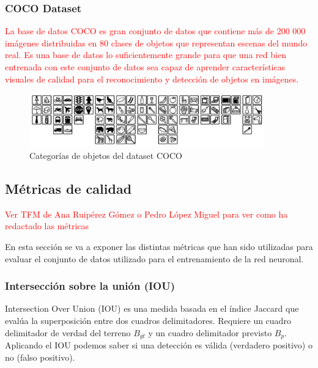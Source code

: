 \subsubsection{COCO Dataset}
\label{subsubsec:coco-dataset}

\textcolor{red}{La base de datos COCO es gran conjunto de datos que contiene más de 200 000 imágenes distribuidas en 80 clases de objetos que representan escenas del mundo real. Es una base de datos lo suficientemente grande para que una red bien entrenada con este conjunto de datos sea capaz de aprender características visuales de calidad para el reconocimiento y detección de objetos en imágenes.}

\begin{figure}[ht]
\centering
\includegraphics[width=0.9\textwidth]{img/chapters/resultados/bases-datos/cocodataset.png}
\caption{\label{fig:cocodataset}Categorías de objetos del dataset COCO}
\end{figure}

\subsection{Métricas de calidad}
\label{subsec:metricas-calidad}

\textcolor{red}{Ver TFM de Ana Ruipérez Gómez o Pedro López Miguel para ver como ha redactado las métricas} 

En esta sección se va a exponer las distintas métricas \cite{padillaCITE2020} que han sido utilizadas para evaluar el conjunto de datos utilizado para el entrenamiento de la red neuronal.

\subsubsection{Intersección sobre la unión (IOU)}
\label{subsubsec:iou}

Intersection Over Union (IOU) es una medida basada en el índice Jaccard que evalúa la superposición entre dos cuadros delimitadores. Requiere un cuadro delimitador de verdad del terreno $B_{gt}$ y un cuadro delimitador previsto $B_{p}$. Aplicando el IOU podemos saber si una detección es válida (verdadero positivo) o no (falso positivo).

